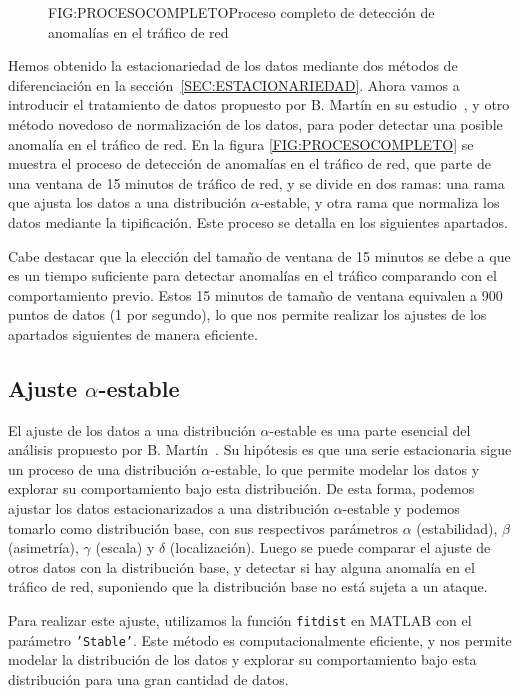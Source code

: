 \begin{figure}[Proceso completo de detección de anomalías en el tráfico de red]{FIG:PROCESOCOMPLETO}{Proceso completo de detección de anomalías en el tráfico de red}
\end{figure}

Hemos obtenido la estacionariedad de los datos mediante dos métodos de diferenciación en la sección~\ref{SEC:ESTACIONARIEDAD}.  Ahora vamos a introducir el tratamiento de datos propuesto por B. Martín en su estudio~\cite{benjamin2021}, y otro método novedoso de normalización de los datos, para poder detectar una posible anomalía en el tráfico de red. En la figura \ref{FIG:PROCESOCOMPLETO} se muestra el proceso de detección de anomalías en el tráfico de red, que parte de una ventana de 15 minutos de tráfico de red, y se divide en dos ramas: una rama que ajusta los datos a una distribución $\alpha$-estable, y otra rama que normaliza los datos mediante la tipificación. Este proceso se detalla en los siguientes apartados.

Cabe destacar que la elección del tamaño de ventana de 15 minutos se debe a que es un tiempo suficiente para detectar anomalías en el tráfico comparando con el comportamiento previo. Estos 15 minutos de tamaño de ventana equivalen a 900 puntos de datos (1 por segundo), lo que nos permite realizar los ajustes de los apartados siguientes de manera eficiente.


\subsection{Ajuste $\alpha$-estable}
El ajuste de los datos a una distribución $\alpha$-estable es una parte esencial del análisis propuesto por B. Martín~\cite{benjamin2021}. Su hipótesis es que una serie estacionaria sigue un proceso de una distribución $\alpha$-estable, lo que permite modelar los datos y explorar su comportamiento bajo esta distribución.
De esta forma, podemos ajustar los datos estacionarizados a una distribución $\alpha$-estable y podemos tomarlo como distribución base, con sus respectivos parámetros $\alpha$ (estabilidad), $\beta$ (asimetría), $\gamma$ (escala) y $\delta$ (localización).
Luego se puede comparar el ajuste de otros datos con la distribución base, y detectar si hay alguna anomalía en el tráfico de red, suponiendo que la distribución base no está sujeta a un ataque.

Para realizar este ajuste, utilizamos la función \texttt{fitdist} en MATLAB con el parámetro \texttt{'Stable'}. Este método es computacionalmente eficiente, y nos permite modelar la distribución de los datos y explorar su comportamiento bajo esta distribución para una gran cantidad de datos.

